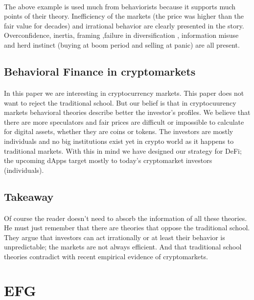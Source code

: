 \documentclass{article}
\begin{document}
\paragraph{ }
The above example is used much from behaviorists because it supports much points of their theory. Inefficiency of the markets (the price was higher than the fair value for decades) and irrational behavior are clearly presented in the story. Overconfidence, inertia, framing ,failure in diversification , information misuse and herd instinct (buying at boom period and selling at panic) are all present.

\subsection{Behavioral Finance in cryptomarkets}
\paragraph{ }
In this paper we are interesting in cryptocurrency markets. This paper does not want to reject the traditional school. But our belief is that in cryptocuurency markets behavioral theories describe better the investor's profiles. We believe that there are more speculators and fair prices are difficult or impossible to calculate for digital assets, whether they are coins or tokens. The investors are mostly individuals and no big institutions exist yet in crypto world as it happens to traditional markets. With this in mind we have designed our strategy for DeFi; the upcoming dApps target mostly to today's cryptomarket investors (individuals).

\subsection{Takeaway}
\paragraph{ }
Of course the reader doesn't need to absorb the information of all these theories. He must just remember that there are theories that oppose the traditional school. They argue that investors can act irrationally or at least their behavior is unpredictable; the markets are not always efficient. And that traditional school theories contradict with recent empirical evidence of cryptomarkets.


\section{EFG}
\end{document}
